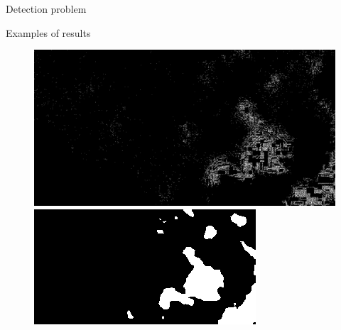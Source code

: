 \documentclass{beamer}
\begin{document}
\begin{section}{Detection problem}
\begin{frame}{Examples of results}
\begin{figure}
	\centering
	\begin{minipage}{0.5\textwidth}
		\includegraphics[scale=0.1]{maxar_maxar_16th_October_27_217_mask.png}
	\end{minipage}%
	\begin{minipage}{0.5\textwidth}
		\includegraphics[scale=0.4]{maxar_maxar_16th_October_27_217_results.png}
	\end{minipage}
\end{figure}

\end{frame}

\end{section}
\end{document}
